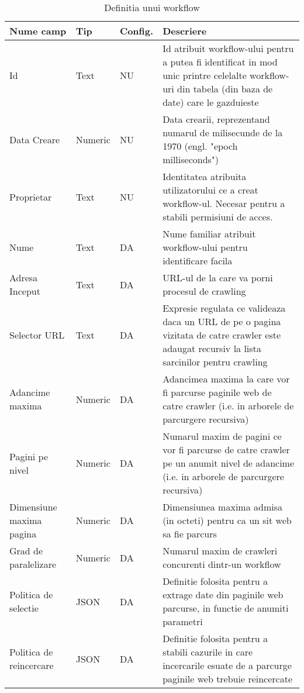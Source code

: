 \begin{table}[h]
	\centering
    \begin{tabular}{|M{2.5cm}|M{1.6cm}|M{1.25cm}|M{7.25cm}|}
    	\hline 
    	Nume camp & Tip & Config. & Descriere \\ \hline
    	
    Id & Text & NU & Id atribuit workflow-ului pentru a putea fi identificat in mod unic printre celelalte workflow-uri din tabela (din baza de date) care le gazduieste \\ \hline
    
    Data Creare & Numeric & NU & Data crearii, reprezentand numarul de milisecunde de la 1970 (engl. "epoch milliseconds") \\ \hline
    
    Proprietar & Text & NU & Identitatea atribuita utilizatorului ce a creat workflow-ul. Necesar pentru a stabili permisiuni de acces. \\ \hline
    
    Nume & Text & DA & Nume familiar atribuit workflow-ului pentru identificare facila \\ \hline
    
    Adresa Inceput & Text & DA & URL-ul de la care va porni procesul de crawling \\ \hline
    
    Selector URL & Text & DA & Expresie regulata ce valideaza daca un URL de pe o pagina vizitata de catre crawler este adaugat recursiv la lista sarcinilor pentru crawling \\ \hline
    
    Adancime maxima & Numeric & DA & Adancimea maxima la care vor fi parcurse paginile web de catre crawler (i.e. in arborele de parcurgere recursiva) \\ \hline
    
    Pagini pe nivel & Numeric & DA & Numarul maxim de pagini ce vor fi parcurse de catre crawler pe un anumit nivel de adancime (i.e. in arborele de parcurgere recursiva) \\ \hline
    
    Dimensiune maxima pagina & Numeric & DA & Dimensiunea maxima admisa (in octeti) pentru ca un sit web sa fie parcurs \\ \hline
    
    Grad de paralelizare & Numeric & DA & Numarul maxim de crawleri concurenti dintr-un workflow \\ \hline
    
    Politica de selectie & JSON & DA & Definitie folosita pentru a extrage date din paginile web parcurse, in functie de anumiti parametri \\ \hline
    
    Politica de reincercare & JSON & DA & Definitie folosita pentru a stabili cazurile in care incercarile esuate de a parcurge paginile web trebuie reincercate \\ \hline
    
    \end{tabular}
    \caption{Definitia unui workflow}
\end{table}
\clearpage